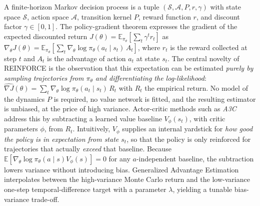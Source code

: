 \documentclass[a4paper,oneside,10pt,english]{scrbook}
\DeclareRobustCommand{\acfit}[1]{\textit{\ac{#1}}}
\begin{document}
A finite-horizon Markov decision process is a tuple $(\mathcal{S}, \mathcal{A}, P, r, \gamma)$ with state space $\mathcal{S}$, action space $\mathcal{A}$, transition kernel $P$, reward function $r$, and discount factor $\gamma \in [0,1]$. The policy-gradient theorem expresses the gradient of the expected discounted return $J(\theta) = \mathbb{E}_{\pi_\theta}\!\left[\sum_t \gamma^t r_t\right]$ as $\nabla_\theta J(\theta) = \mathbb{E}_{\pi_\theta}\!\left[\sum_t \nabla_\theta \log \pi_\theta(a_t \mid s_t)\, A_t\right]$, where $r_t$ is the reward collected at step $t$ and $A_t$ is the advantage of action $a_t$ at state $s_t$. The central novelty of REINFORCE \citep{reinforce,revisitingreinforce} is the observation that this expectation can be estimated \emph{purely by sampling trajectories from $\pi_\theta$ and differentiating the log-likelihood}: $\widehat{\nabla J}(\theta) = \sum_t \nabla_\theta \log \pi_\theta(a_t \mid s_t)\, R_t$ with $R_t$ the empirical return. No model of the dynamics $P$ is required, no value network is fitted, and the resulting estimator is unbiased, at the price of high variance. Actor-critic methods such as \acfit{A3C} \citep{a3c} address this by subtracting a learned value baseline $V_\phi(s_t)$, with critic parameters $\phi$, from $R_t$. Intuitively, $V_\phi$ supplies an internal yardstick for \emph{how good the policy is in expectation from state $s_t$}, so that the policy is only reinforced for trajectories that actually \emph{exceed} that baseline. Because $\mathbb{E}[\nabla_\theta \log \pi_\theta(a \mid s) V_\phi(s)] = 0$ for any $a$-independent baseline, the subtraction lowers variance without introducing bias. Generalized Advantage Estimation \citep{gae} interpolates between the high-variance Monte Carlo return and the low-variance one-step temporal-difference target with a parameter $\lambda$, yielding a tunable bias-variance trade-off.
\end{document}
